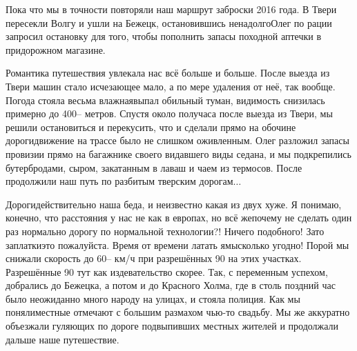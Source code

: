 Пока что мы в точности повторяли наш маршрут заброски 2016 года. В Твери пересекли Волгу и ушли на Бежецк, остановившись ненадолго\mdash Олег по рации запросил остановку для того, чтобы пополнить запасы походной аптечки в придорожном магазине. 

Романтика путешествия увлекала нас всё больше и больше. После выезда из Твери машин стало исчезающее мало, а по мере удаления от неё, так вообще. Погода стояла весьма влажная\mdash выпал обильный туман, видимость снизилась примерно до 400\thinspace\nobreakdash-- метров. Спустя около получаса после выезда из Твери, мы решили остановиться и перекусить, что и сделали прямо на обочине дороги\mdash движение на трассе было не слишком оживленным. Олег разложил запасы провизии прямо на багажнике своего видавшего виды седана, и мы подкрепились бутербродами, сыром, закатанным в лаваш и чаем из термосов. После продолжили наш путь по разбитым тверским дорогам$\ldots$

Дороги\mdash действительно наша беда, и неизвестно какая из двух хуже. Я понимаю, конечно, что расстояния у нас не как в европах, но всё же\mdash почему не сделать один раз нормально дорогу по нормальной технологии?! Ничего подобного! Зато заплатки\mdash это пожалуйста. Время от времени латать ямы\mdash сколько угодно! Порой мы снижали скорость до 60\thinspace\nobreakdash-- км/ч при разрешённых 90 на этих участках. Разрешённые 90 тут как издевательство скорее. Так, с переменным успехом, добрались до Бежецка, а потом и до Красного Холма, где в столь поздний час было неожиданно много народу на улицах, и стояла полиция. Как мы поняли\mdash местные отмечают с большим размахом чью-то свадьбу. Мы же аккуратно объезжали гуляющих по дороге подвыпивших местных жителей и продолжали дальше наше путешествие. 

